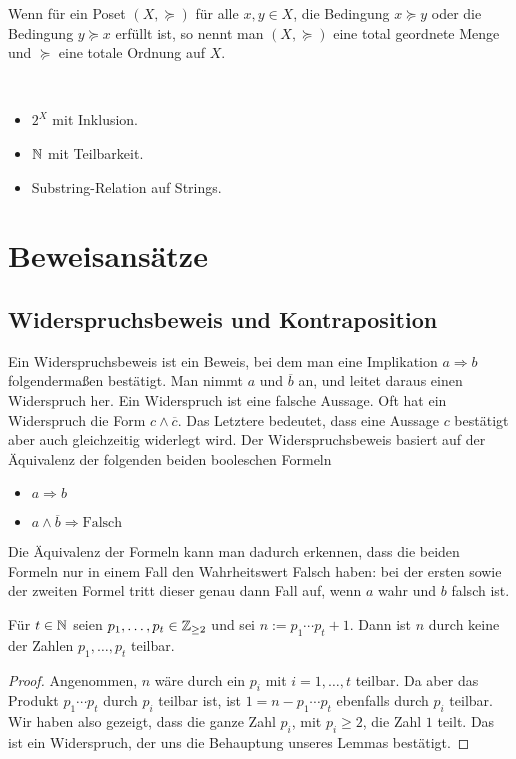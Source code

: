 \begin{defn}
	Wenn für ein Poset $(X,\succeq)$ für alle $x, y \in X$, die Bedingung $x \succeq y$ oder die Bedingung $y \succeq x$ erfüllt ist, so nennt  man $(X,\succeq)$ eine total geordnete Menge und $\succeq$ eine totale Ordnung auf $X$. 
\end{defn} 

\begin{bsp}\
	\begin{itemize}
		\item $2^X$ mit Inklusion. 
		\item $\mathbb{N}$ mit Teilbarkeit. 
		\item Substring-Relation auf Strings. 
	\end{itemize} 
\end{bsp} 


\section{Beweisansätze} 

\subsection{Widerspruchsbeweis und Kontraposition} 

\begin{bem}
	Ein Widerspruchsbeweis ist ein Beweis, bei dem man eine Implikation $a \Rightarrow b$ folgendermaßen bestätigt. Man nimmt $a$ und $\overline{b}$ an, und leitet daraus einen Widerspruch her. Ein Widerspruch ist eine falsche Aussage. Oft hat ein Widerspruch die Form $c \wedge \overline{c}$. Das Letztere bedeutet, dass eine Aussage $c$ bestätigt aber auch gleichzeitig widerlegt wird. Der Widerspruchsbeweis basiert  auf der Äquivalenz der folgenden beiden booleschen Formeln 
	\begin{itemize}
		\item $a \Rightarrow b$
		\item $a \wedge \overline{b} \Rightarrow \text{Falsch}$
	\end{itemize} 
	Die Äquivalenz der Formeln kann man dadurch erkennen, dass die beiden Formeln nur in einem Fall den Wahrheitswert Falsch haben: bei der ersten sowie der zweiten Formel tritt dieser genau dann Fall auf, wenn $a$ wahr und $b$ falsch ist. 
\end{bem} 

\begin{lem}
	Für $t \in \mathbb{N}$ seien $p_1,\ldots,p_t \in \mathbb{Z}_{\ge 2}$ und sei $n := p_1 \cdots p_t + 1$. Dann ist $n$ durch keine der Zahlen $p_1,\ldots,p_t$ teilbar. 
\end{lem} 
\begin{proof} 
	Angenommen, $n$ wäre durch ein $p_i$ mit $i=1,\ldots,t$ teilbar. Da aber das Produkt $p_1 \cdots p_t$ durch $p_i$ teilbar ist, ist $1 = n - p_1 \cdots p_t$ ebenfalls durch $p_i$ teilbar. Wir haben also gezeigt, dass die ganze Zahl $p_i$, mit $p_i \ge 2$, die Zahl $1$ teilt. Das ist ein Widerspruch, der uns die Behauptung unseres Lemmas bestätigt. 
\end{proof} 

